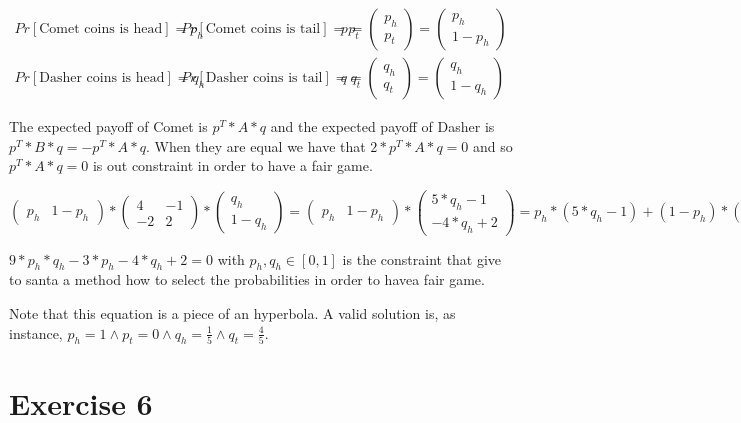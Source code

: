 \documentclass[paper=a4, fontsize=11pt]{scrartcl} %
\numberwithin{equation}{section} %
\numberwithin{figure}{section} %
\numberwithin{table}{section} %
\begin{document}
\[
\begin{array}{lll}
    Pr[\text{Comet coins is head}] = p_h & Pr[\text{Comet coins is tail}] = p_t & p = \begin{pmatrix} p_h \\ p_t \end{pmatrix} = \begin{pmatrix} p_h \\ 1 - p_h \end{pmatrix} \\
    Pr[\text{Dasher coins is head}] = q_h & Pr[\text{Dasher coins is tail}] = q_t & q = \begin{pmatrix} q_h \\ q_t \end{pmatrix} = \begin{pmatrix} q_h \\ 1 - q_h \end{pmatrix} 
\end{array}
\]

The expected payoff of Comet is $p^T*A*q$ and the expected payoff of Dasher is $p^T*B*q = -p^T*A*q$. When they are equal we have that $2*p^T*A*q=0$ and so $p^T*A*q=0$ is out constraint in order to have a fair game.

\bigskip
$\begin{pmatrix} p_h & 1 - p_h \end{pmatrix}*\begin{pmatrix} 4 & -1 \\ -2 & 2 \end{pmatrix}*\begin{pmatrix} q_h \\ 1 - q_h \end{pmatrix} = \begin{pmatrix} p_h & 1 - p_h \end{pmatrix}*\begin{pmatrix} 5*q_h -1 \\ -4*q_h +2 \end{pmatrix} = p_h*(5*q_h -1) + (1-p_h)*(-4*q_h +2) = 9*p_h*q_h -3*p_h -4*q_h +2$
\bigskip

$9*p_h*q_h -3*p_h -4*q_h +2 = 0$ with $p_h, q_h \in [0,1]$ is the constraint that give to santa a method how to select the probabilities in order to havea fair game.

Note that this equation is a piece of an hyperbola. A valid solution is, as instance, $p_h = 1 \land p_t = 0 \land q_h = \frac{1}{5} \land q_t = \frac{4}{5}$.

\newpage
\section{Exercise 6}
\end{document}
